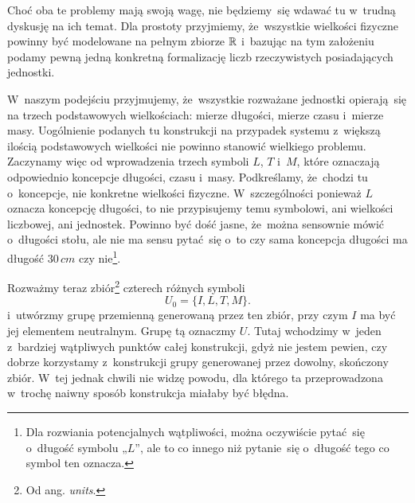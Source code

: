 \documentclass[a4paper,11pt]{article}
\numberwithin{equation}{section}
\begin{document}
Choć oba te problemy mają swoją wagę, nie będziemy~się wdawać tu w~trudną
dyskusję na ich temat. Dla prostoty przyjmiemy, że~wszystkie wielkości
fizyczne powinny być modelowane na pełnym zbiorze $\mathbb{R}$ i~bazując
na tym założeniu podamy pewną jedną konkretną formalizację liczb
rzeczywistych posiadających jednostki.

W~naszym podejściu przyjmujemy, że~wszystkie rozważane jednostki
opierają~się na trzech podstawowych wielkościach: mierze długości,
mierze czasu i~mierze masy. Uogólnienie podanych tu konstrukcji na
przypadek systemu z~większą ilością podstawowych wielkości nie powinno
stanowić wielkiego problemu. Zaczynamy więc od wprowadzenia trzech symboli
$L$, $T$ i~$M$, które oznaczają odpowiednio koncepcje długości, czasu
i~masy. Podkreślamy, że~chodzi tu o~koncepcje, nie konkretne wielkości
fizyczne. W~szczególności ponieważ $L$ oznacza koncepcję długości, to nie
przypisujemy temu symbolowi, ani wielkości liczbowej, ani jednostek.
Powinno być dość jasne, że~można sensownie mówić o~długości stołu, ale nie
ma sensu pytać~się o~to czy sama koncepcja długości ma długość
$30 \, \si{cm}$ czy nie\footnote{Dla rozwiania potencjalnych wątpliwości,
  można oczywiście pytać~się o~długość symbolu „$L$”, ale to co innego niż
  pytanie~się o~długość tego co symbol ten oznacza.}.

Rozważmy teraz zbiór\footnote{Od ang. \textit{units}.} czterech różnych
symboli
\begin{equation}
  \label{eq:Mechanika-Rozwazania-ogolne-02}
  U_{ 0 } = \{ I, L, T, M \}.
\end{equation}
i~utwórzmy grupę przemienną generowaną przez ten zbiór, przy czym $I$ ma
być jej elementem neutralnym. Grupę tą oznaczmy $U$. Tutaj wchodzimy
w~jeden z~bardziej wątpliwych punktów całej konstrukcji, gdyż nie jestem
pewien, czy dobrze korzystamy z~konstrukcji grupy generowanej przez
dowolny, skończony zbiór. W~tej jednak chwili nie widzę powodu, dla
którego ta przeprowadzona w~trochę naiwny sposób konstrukcja miałaby
być błędna.
\end{document}
